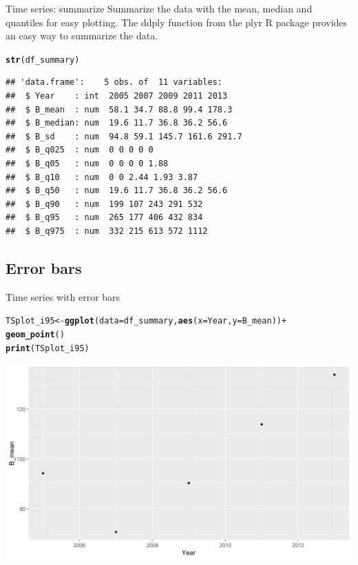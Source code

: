 \documentclass{beamer}\usepackage[]{graphicx}\usepackage[]{color}
\makeatletter
\newcommand{\hlopt}[1]{\textcolor[rgb]{0,0,0}{#1}}%
\newcommand{\hlstd}[1]{\textcolor[rgb]{0.345,0.345,0.345}{#1}}%
\newcommand{\hlkwb}[1]{\textcolor[rgb]{0.69,0.353,0.396}{#1}}%
\newcommand{\hlkwc}[1]{\textcolor[rgb]{0.333,0.667,0.333}{#1}}%
\newcommand{\hlkwd}[1]{\textcolor[rgb]{0.737,0.353,0.396}{\textbf{#1}}}%
\newenvironment{kframe}{%
 \def\at@end@of@kframe{}%
 \ifinner\ifhmode%
  \def\at@end@of@kframe{\end{minipage}}%
  \begin{minipage}{\columnwidth}%
 \fi\fi%
 \def\FrameCommand##1{\hskip\@totalleftmargin \hskip-\fboxsep
 \colorbox{shadecolor}{##1}\hskip-\fboxsep
     \hskip-\linewidth \hskip-\@totalleftmargin \hskip\columnwidth}%
 \MakeFramed {\advance\hsize-\width
   \@totalleftmargin\z@ \linewidth\hsize
   \@setminipage}}%
 {\par\unskip\endMakeFramed%
 \at@end@of@kframe}
\newenvironment{knitrout}{}{} %
\makeatother
\begin{document}
\begin{frame}[fragile]{Time series: summarize}
Summarize the data with the mean, median and quantiles for easy plotting.
The ddply function from the plyr R package provides an easy way to summarize the data.
\begin{knitrout}\footnotesize
{}\color{fgcolor}\begin{kframe}
\begin{alltt}
\hlkwd{str}\hlstd{(df_summary)}
\end{alltt}
\begin{verbatim}
## 'data.frame':	5 obs. of  11 variables:
##  $ Year    : int  2005 2007 2009 2011 2013
##  $ B_mean  : num  58.1 34.7 88.8 99.4 178.3
##  $ B_median: num  19.6 11.7 36.8 36.2 56.6
##  $ B_sd    : num  94.8 59.1 145.7 161.6 291.7
##  $ B_q025  : num  0 0 0 0 0
##  $ B_q05   : num  0 0 0 0 1.88
##  $ B_q10   : num  0 0 2.44 1.93 3.87
##  $ B_q50   : num  19.6 11.7 36.8 36.2 56.6
##  $ B_q90   : num  199 107 243 291 532
##  $ B_q95   : num  265 177 406 432 834
##  $ B_q975  : num  332 215 613 572 1112
\end{verbatim}
\end{kframe}
\end{knitrout}
\end{frame}


\subsection{Error bars}

\begin{frame}[fragile]{Time series with error bars}
\begin{knitrout}\footnotesize
{}\color{fgcolor}\begin{kframe}
\begin{alltt}
\hlstd{TSplot_i95} \hlkwb{<-} \hlkwd{ggplot}\hlstd{(}\hlkwc{data}\hlstd{=df_summary,} \hlkwd{aes}\hlstd{(}\hlkwc{x}\hlstd{=Year,} \hlkwc{y}\hlstd{=B_mean))} \hlopt{+}
  \hlkwd{geom_point}\hlstd{()}
\hlkwd{print}\hlstd{(TSplot_i95)}
\end{alltt}
\end{kframe}

{\centering \includegraphics[width=.9\linewidth]{figure/sp_TSplot_i95a-1} 

}



\end{knitrout}
\end{frame}
\end{document}
